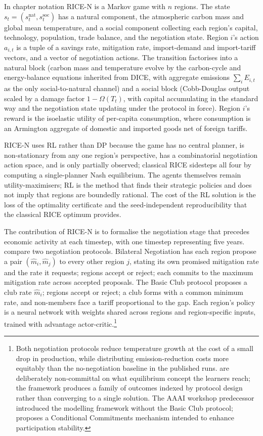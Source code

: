In chapter notation RICE-N is a Markov game with $n$ regions. The
state $s_t = (s^{\mathrm{nat}}_t, s^{\mathrm{soc}}_t)$ has a natural
component, the atmospheric carbon mass and global mean temperature,
and a social component collecting each region's capital, technology,
population, trade balance, and the negotiation state. Region $i$'s
action $a_{i,t}$ is a tuple of a savings rate, mitigation rate,
import-demand and import-tariff vectors, and a vector of negotiation
actions. The transition factorises into a natural block (carbon mass
and temperature evolve by the carbon-cycle and energy-balance
equations inherited from DICE, with aggregate emissions
$\sum_i E_{i,t}$ as the only social-to-natural channel) and a social
block (Cobb-Douglas output scaled by a damage factor
$1 - \Omega(T_t)$, with capital accumulating in the standard way and
the negotiation state updating under the protocol in force). Region
$i$'s reward is the isoelastic utility of per-capita consumption,
where consumption is an Armington aggregate of domestic and imported
goods net of foreign tariffs.

RICE-N uses RL rather than DP because the game has no central
planner, is non-stationary from any one region's perspective, has a
combinatorial negotiation action space, and is only partially
observed; classical RICE sidesteps all four by computing a
single-planner Nash equilibrium. The agents themselves remain
utility-maximisers; RL is the method that finds their strategic
policies and does not imply that regions are boundedly rational. The cost
of the RL solution is the loss of the optimality certificate and the
seed-independent reproducibility that the classical RICE optimum
provides.

The contribution of RICE-N is to formalise the negotiation stage
that precedes economic activity at each timestep, with one timestep
representing five years. \citet{Zhang2025ricen} compare two
negotiation protocols. Bilateral Negotiation has each region propose
a pair $(\hat{m}_i, \hat{m}_j)$ to every other region $j$, stating
its own promised mitigation rate and the rate it requests; regions
accept or reject; each commits to the maximum mitigation rate across
accepted proposals. The Basic Club protocol \citep{Nordhaus2015climateclubs}
proposes a club rate $\hat{m}_i$; regions accept or reject; a club
forms with a common minimum rate, and non-members face a tariff
proportional to the gap. Each region's policy is a neural network
with weights shared across regions and region-specific inputs,
trained with advantage actor-critic.\footnote{Both negotiation
protocols reduce temperature growth at the cost of a small drop in
production, while distributing emission-reduction costs more
equitably than the no-negotiation baseline in the published runs.
\citet{Zhang2025ricen} are deliberately non-committal on what
equilibrium concept the learners reach; the framework produces a
family of outcomes indexed by protocol design rather than converging
to a single solution. The AAAI workshop predecessor
\citep{Zhang2022ricen} introduced the modelling framework without
the Basic Club protocol; \citet{Heitzig2023ccf} proposes a Conditional
Commitments mechanism intended to enhance participation stability.}

